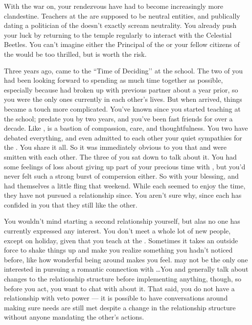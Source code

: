 \documentclass[char]{GL2020}
\begin{document}
With the war on, your rendezvous have had to become increasingly more clandestine. Teachers at the \pSchool{} are supposed to be neutral entities, and publically dating a politician of the \pShip{} doesn’t exactly scream neutrality. You already push your luck by returning to the temple regularly to interact with the Celestial Beetles. You can’t imagine either the Principal of the \pSc{} or your fellow citizens of the \pTech{} would be too thrilled, but \cJuniorStatesman{} is worth the risk. 

Three years ago, \cJuniorStatesman{} came to the ``Time of Deciding’’ at the school. The two of you had been looking forward to spending as much time together as possible, especially because \cJuniorStatesman{} had broken up with \cJuniorStatesman{\their} previous partner about a year prior, so you were the only ones currently in each other’s lives. But when \cJuniorStatesman{\they} arrived, things became a touch more complicated. You’ve known \cEthics{} since you started teaching at the school; \cEthics{\they} predate\cEthics{\verbs} you by two years, and you’ve been fast friends for over a decade. Like \cMusic{}, \cEthics{} is a bastion of compassion, care, and thoughtfulness. You two have debated everything, and even admitted to each other your quiet sympathies for the \pShippies{}. You share it all. So it was immediately obvious to you that \cJuniorStatesman{} and \cEthics{} were smitten with each other. The three of you sat down to talk about it. You had some feelings of loss about giving up part of your precious time with \cJuniorStatesman{}, but you’d never felt such a strong burst of compersion either. So with your blessing, \cJuniorStatesman{} and \cBeetle{} had themselves a little fling that weekend. While each seemed to enjoy the time, they have not pursued a relationship since. You aren’t sure why, since each has confided in you that they still like the other.

You wouldn't mind starting a second relationship yourself, but alas no one has currently expressed any interest. You don't meet a whole lot of new people, except on holiday, given that you teach at the \pSc{}. Sometimes it takes an outside force to shake things up and make you realize something you hadn’t noticed before, like how wonderful being around \cEthics{} makes you feel. \cJuniorStatesman{} may not be the only one interested in pursuing a romantic connection with \cEthics{}\ldots You and \cJuniorStatesman{} generally talk about changes to the relationship structure before implementing anything, though, so before you act, you want to chat with \cJuniorStatesman{} about it. That said, you do not have a relationship with veto power — it is possible to have conversations around making sure needs are still met despite a change in the relationship structure without anyone mandating the other's actions.
\end{document}
